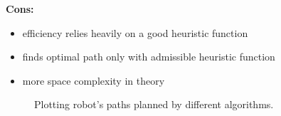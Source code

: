 \documentclass[12pt]{article}
\begin{document}
\begin{enumerate}
\begin{enumerate}
\begin{multicols}{2}
            \textbf{Cons:}
            \begin{itemize}
                \item efficiency relies heavily on a good heuristic function
                \item finds optimal path only with admissible heuristic function
                \item more space complexity in theory
            \end{itemize}

        \end{multicols}
    
        \begin{figure}[h]
            \centering
            \caption{Plotting robot's paths planned by different algorithms.}
            \label{fig:odom_plot}\vspace{-10pt}
        \end{figure}


\end{enumerate}
\end{enumerate}
\end{document}
